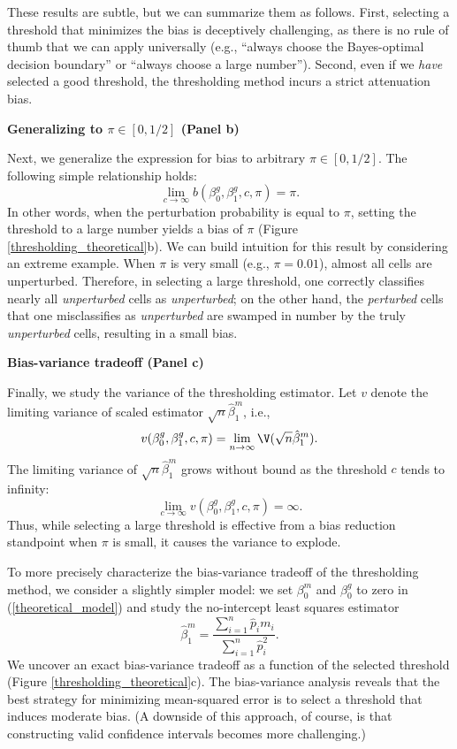 \documentclass[12pt]{article}
\begin{document}
These results are subtle, but we can summarize them as follows. First, selecting a threshold that minimizes the bias is deceptively challenging, as there is no rule of thumb that we can apply universally (e.g., ``always choose the Bayes-optimal decision boundary'' or ``always choose a large number''). Second, even if we \textit{have} selected a good threshold, the thresholding method incurs a strict attenuation bias.

\begin{center}
\textbf{Generalizing to $\pi \in [0,1/2]$ (Panel b)}
\end{center}

Next, we generalize the expression for bias to arbitrary $\pi \in [0,1/2]$. The following simple relationship holds:
$$ \lim_{ c \to \infty } b(\beta^g_0, \beta^g_1, c, \pi) = \pi.$$ In other words, when the perturbation probability is equal to $\pi$, setting the threshold to a large number yields a bias of $\pi$ (Figure \ref{thresholding_theoretical}b). We can build intuition for this result by considering an extreme example. When $\pi$ is very small (e.g., $\pi = 0.01$), almost all cells are unperturbed. Therefore, in selecting a large threshold, one correctly classifies nearly all \textit{unperturbed} cells as \textit{unperturbed}; on the other hand, the \textit{perturbed} cells that one misclassifies as \textit{unperturbed} are swamped in number by the truly \textit{unperturbed} cells, resulting in a small bias.

\begin{center}
	\textbf{Bias-variance tradeoff (Panel c)}
\end{center}

Finally, we study the variance of the thresholding estimator. Let $v$ denote the limiting variance of scaled estimator $\sqrt{n} \hat{\beta}^m_1$, i.e.,
$$v(\beta^g_0, \beta^g_1, c, \pi) = \lim_{n \to \infty} \V(\sqrt{n} \hat{\beta}^m_1).$$ The limiting variance of $\sqrt{n} \hat{\beta}^m_1$ grows without bound as the threshold $c$ tends to infinity: 
$$ \lim_{c \to \infty} v(\beta^g_0, \beta^g_1, c, \pi) = \infty.$$ Thus, while selecting a large threshold is effective from a bias reduction standpoint when $\pi$ is small, it causes the variance to explode.

To more precisely characterize the bias-variance tradeoff of the thresholding method, we consider a slightly simpler model: we set $\beta^m_0$ and $\beta^g_0$ to zero in (\ref{theoretical_model}) and study the no-intercept least squares estimator
$$ \hat{\beta}^m_1 =  \frac{ \sum_{i=1}^n \hat{p}_i m_i }{ \sum_{i=1}^n \hat{p}_i^2}.$$ We uncover an exact bias-variance tradeoff as a function of the selected threshold (Figure \ref{thresholding_theoretical}c). The bias-variance analysis reveals that the best strategy for minimizing mean-squared error is to select a threshold that induces moderate bias. (A downside of this approach, of course, is that constructing valid confidence intervals becomes more challenging.)
\end{document}
